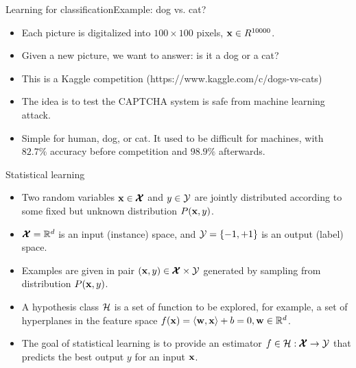 \documentclass[first=dgreen,second=purple,logo=yellowexc]{aaltoslides}
\begin{document}
{\begin{frame}{Learning for classification}{Example: dog vs. cat?}
\begin{itemize}
\begin{center}
		\end{center}
		\item Each picture is digitalized into $100\times100$ pixels, $\mathbf {x} \in R^{10000}$.
		\item Given a new picture, we want to answer: is it a dog or a cat?
		\item This is a Kaggle competition (https://www.kaggle.com/c/dogs-vs-cats)
		\item The idea is to test the CAPTCHA system is safe from machine learning attack.
		\item Simple for human, dog, or cat. It used to be difficult for machines, with $82.7\%$ accuracy \citep{Golle08machine} before competition and $98.9\%$ afterwards.
	\end{itemize}
\end{frame}

\begin{frame}{Statistical learning}
	\begin{itemize}
		\item Two random variables $\mathbf {x}\in\pmb {\mathcal{X}}$ and $y\in\mathcal{Y}$ are jointly distributed according to some fixed but unknown distribution $P(\mathbf {x},y)$.
		\item $\pmb {\mathcal{X}}=\mathbb{R}^d$ is an input (instance) space, and $\mathcal{Y}=\{-1,+1\}$ is an output (label) space.
		\item Examples are given in pair $(\mathbf {x},y)\in\pmb {\mathcal{X}}\times\mathcal{Y}$ generated by sampling from distribution $P(\mathbf {x},y)$.
		\item A hypothesis class $\mathcal{H}$ is a set of function to be explored, for example, a set of hyperplanes in the feature space $f(\mathbf {x})=\langle \mathbf {w}, \mathbf {x} \rangle+b=0, \mathbf {w}\in\mathbb{R}^d$. 
		\item The goal of statistical learning is to provide an estimator $f\in\mathcal{H}:\pmb {\mathcal{X}}\rightarrow\mathcal{Y}$ that predicts the best output $y$ for an input $\mathbf {x}$. 
	\end{itemize}
\end{frame}


}
\end{document}
